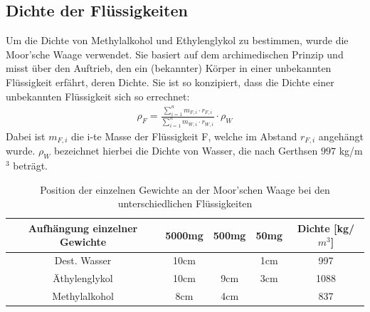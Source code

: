 \documentclass[12pt,a4paper,titlepage,headinclude,bibtotoc]{scrartcl}
\begin{document}
\subsection{Dichte der Flüssigkeiten}
Um die Dichte von Methylalkohol und Ethylenglykol zu bestimmen, wurde die Moor'sche Waage verwendet.
Sie basiert auf dem archimedischen Prinzip und misst über den Auftrieb, den ein (bekannter) Körper in einer unbekannten Flüssigkeit erfährt, deren Dichte.
Sie ist so konzipiert, dass die Dichte einer unbekannten Flüssigkeit sich so errechnet:
\begin{align}
\rho_F=\frac{\sum\limits_{i=1}^nm_{F,i}\cdot r_{F,i}}{\sum\limits_{i=1}^nm_{W,i}\cdot r_{W,i}}\cdot\rho_W
\end{align}
Dabei ist $m_{F,i}$ die i-te Masse der Flüssigkeit F, welche im Abstand $r_{F,i}$ angehängt wurde.
$\rho_W$ bezeichnet hierbei die Dichte von Wasser, die nach Gerthsen \cite{gerthsen} $997$ kg/m$^3$ beträgt.
\begin{table}
\centering
\begin{tabular}{|c|c|c|c|c|}
\hline Aufhängung einzelner Gewichte & 5000mg & 500mg & 50mg &Dichte [kg/$m^3$]\\
\hline Dest. Wasser  & 10cm	&	& 1cm	& 997	\\
\hline Äthylenglykol & 10cm	& 9cm	& 3cm	& 1088	\\
\hline Methylalkohol & 8cm	& 4cm	& 	& 837	\\\hline
\end{tabular}
\caption{Position der einzelnen Gewichte an der Moor'schen Waage bei den unterschiedlichen Flüssigkeiten\label{tab:dichte}}
\end{table}
\end{document}
